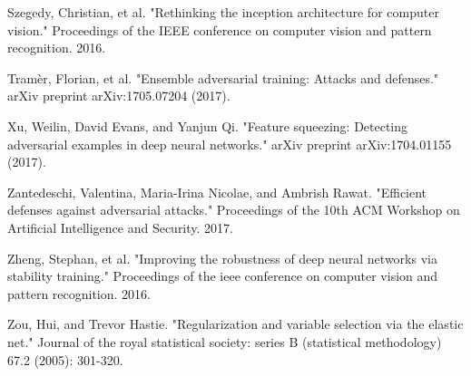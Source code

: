 \begin{thebibliography}{9}
    \bibitem{}
    Szegedy, Christian, et al. "Rethinking the inception architecture for computer vision." Proceedings of the IEEE conference on computer vision and pattern recognition. 2016.

    \bibitem{}
    Tramèr, Florian, et al. "Ensemble adversarial training: Attacks and defenses." arXiv preprint arXiv:1705.07204 (2017).

    \bibitem{}
    Xu, Weilin, David Evans, and Yanjun Qi. "Feature squeezing: Detecting adversarial examples in deep neural networks." arXiv preprint arXiv:1704.01155 (2017).

    \bibitem{}
    Zantedeschi, Valentina, Maria-Irina Nicolae, and Ambrish Rawat. "Efficient defenses against adversarial attacks." Proceedings of the 10th ACM Workshop on Artificial Intelligence and Security. 2017.

    \bibitem{}
    Zheng, Stephan, et al. "Improving the robustness of deep neural networks via stability training." Proceedings of the ieee conference on computer vision and pattern recognition. 2016.

    \bibitem{}
    Zou, Hui, and Trevor Hastie. "Regularization and variable selection via the elastic net." Journal of the royal statistical society: series B (statistical methodology) 67.2 (2005): 301-320.
\end{thebibliography}